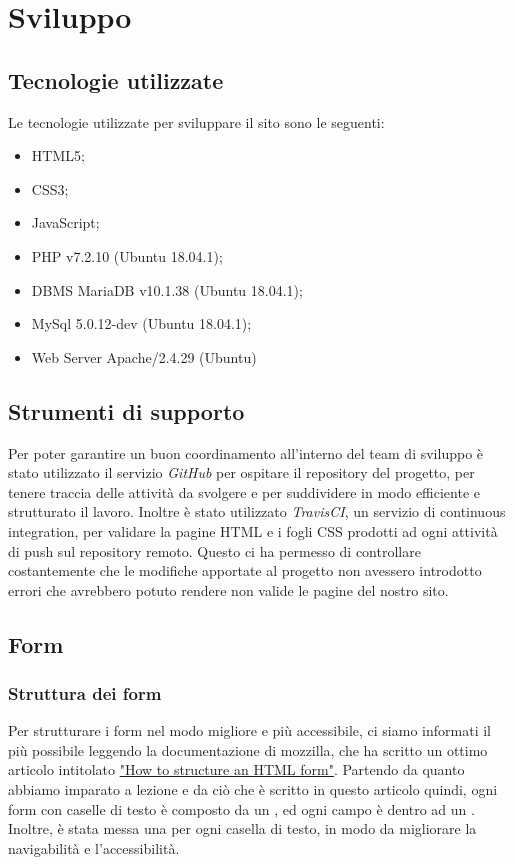 \documentclass[12pt]{article}
\begin{document}
	\section{Sviluppo}
	\subsection{Tecnologie utilizzate}
	Le tecnologie utilizzate per sviluppare il sito sono le seguenti:
	\begin{itemize}
		\item HTML5;
		\item CSS3;
		\item JavaScript;
		\item PHP v7.2.10 (Ubuntu 18.04.1);
		\item DBMS MariaDB v10.1.38 (Ubuntu 18.04.1);
		\item MySql 5.0.12-dev (Ubuntu 18.04.1);
		\item Web Server Apache/2.4.29 (Ubuntu)
	\end{itemize}
	\subsection{Strumenti di supporto}
	Per poter garantire un buon coordinamento all'interno del team di sviluppo è stato utilizzato il servizio \emph{GitHub} per ospitare il repository del progetto, per tenere traccia delle attività da svolgere e per suddividere in modo efficiente e strutturato il lavoro. Inoltre è stato utilizzato \emph{TravisCI}, un servizio di continuous integration, per validare la pagine HTML e i fogli CSS prodotti ad ogni attività di push sul repository remoto. Questo ci ha permesso di controllare costantemente che le modifiche apportate al progetto non avessero introdotto errori che avrebbero potuto rendere non valide le pagine del nostro sito.
	\subsection{Form}
	\subsubsection{Struttura dei form}
	Per strutturare i form nel modo migliore e più accessibile, ci siamo informati il più possibile leggendo la documentazione di mozzilla, che ha scritto un ottimo articolo intitolato \href{https://developer.mozilla.org/en-US/docs/Learn/HTML/Forms/How_to_structure_an_HTML_form}{"How to structure an HTML form"}. Partendo da quanto abbiamo imparato a lezione e da ciò che è scritto in questo articolo quindi, ogni form con caselle di testo è composto da un \textit{}, ed ogni campo è dentro ad un \textit{}. Inoltre, è stata messa una \textit{} per ogni casella di testo, in modo da migliorare la navigabilità e l'accessibilità.
	
\end{document}
